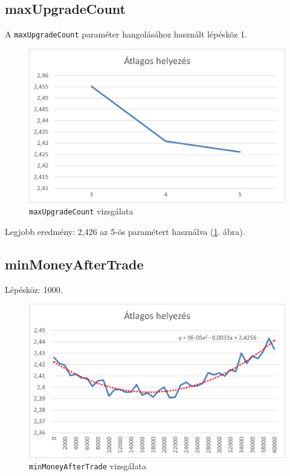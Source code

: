 \subsection{maxUpgradeCount}

A \texttt{maxUpgradeCount} paraméter hangolásához használt lépésköz 1.

\begin{figure}[h!]
\centering
\includegraphics[scale=0.2]{images/bbb.png}
\caption{\texttt{maxUpgradeCount} vizsgálata}
\label{fig:maxUpgradeCount}
\end{figure}

Legjobb eredmény: 2,426 az 5-ös paramétert használva (\ref{fig:maxUpgradeCount}. ábra).

\subsection{minMoneyAfterTrade}

Lépésköz: 1000.

\begin{figure}[h!]
\centering
\includegraphics[scale=0.2]{images/aaaaaaaaa.png}
\caption{\texttt{minMoneyAfterTrade} vizsgálata}
\label{fig:minMoneyAfterTrade}
\end{figure}

